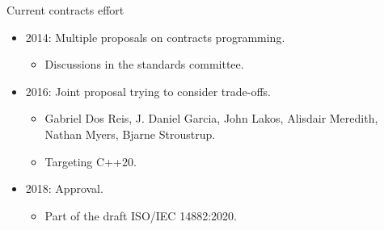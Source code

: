 \begin{frame}[t]{Current contracts effort}
\begin{itemize}
  \item 2014: Multiple proposals on contracts programming.
    \begin{itemize}
      \item Discussions in the standards committee.
    \end{itemize}

  \vfill\pause
  \item 2016: Joint proposal trying to consider trade-offs.
    \begin{itemize}
      \item Gabriel Dos Reis, J. Daniel Garcia, John Lakos, Alisdair Meredith,
Nathan Myers, Bjarne Stroustrup.
    \vfill
      \item Targeting C++20.
    \end{itemize}

  \vfill\pause
  \item 2018: Approval.
    \begin{itemize}
      \item Part of the draft ISO/IEC 14882:2020.
    \end{itemize}
\end{itemize}
\end{frame}
